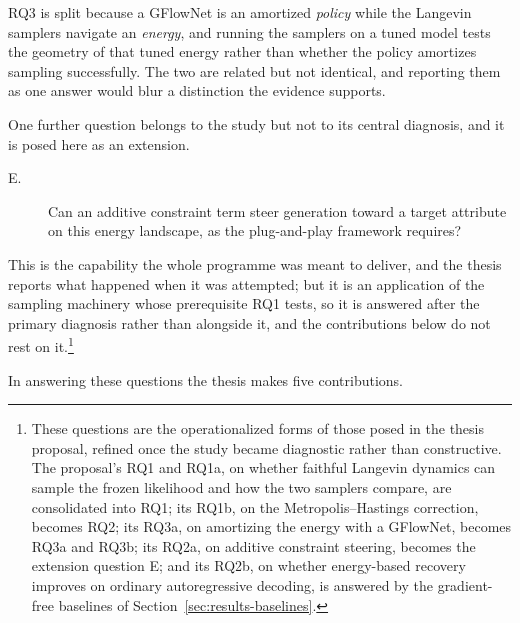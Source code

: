 RQ3 is split because a GFlowNet is an amortized \emph{policy} while the Langevin samplers navigate an \emph{energy}, and running the samplers on a tuned model tests the geometry of that tuned energy rather than whether the policy amortizes sampling successfully. The two are related but not identical, and reporting them as one answer would blur a distinction the evidence supports.

One further question belongs to the study but not to its central diagnosis, and it is posed here as an extension.

\begin{description}
    \item[E.] Can an additive constraint term steer generation toward a target attribute on this energy landscape, as the plug-and-play framework requires?
\end{description}

This is the capability the whole programme was meant to deliver, and the thesis reports what happened when it was attempted; but it is an application of the sampling machinery whose prerequisite RQ1 tests, so it is answered after the primary diagnosis rather than alongside it, and the contributions below do not rest on it.\footnote{These questions are the operationalized forms of those posed in the thesis proposal, refined once the study became diagnostic rather than constructive. The proposal's RQ1 and RQ1a, on whether faithful Langevin dynamics can sample the frozen likelihood and how the two samplers compare, are consolidated into RQ1; its RQ1b, on the Metropolis--Hastings correction, becomes RQ2; its RQ3a, on amortizing the energy with a GFlowNet, becomes RQ3a and RQ3b; its RQ2a, on additive constraint steering, becomes the extension question E; and its RQ2b, on whether energy-based recovery improves on ordinary autoregressive decoding, is answered by the gradient-free baselines of Section~\ref{sec:results-baselines}.}

In answering these questions the thesis makes five contributions.

